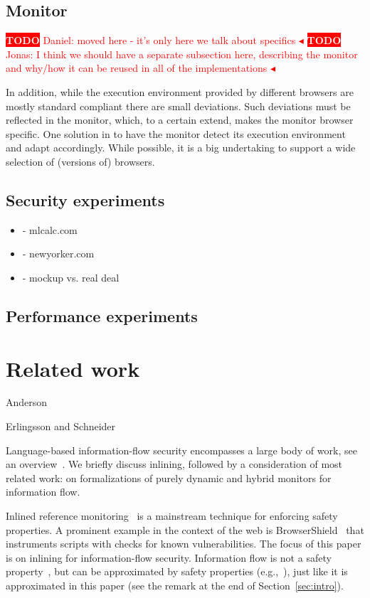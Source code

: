 \documentclass{llncs}
\newcommand{\todo}[1]{\colorbox{red}{\textcolor{white}{\sffamily\bfseries\scriptsize TODO}} \textcolor{red}{#1} \textcolor{red}{$\blacktriangleleft$}}
\begin{document}
\subsection{Monitor}

\todo{Daniel: moved here - it's only here we talk about specifics}
\todo{Jonas: I think we should have a separate subsection here, describing the monitor and why/how it can be reused in all of the implementations}

In addition, while the
execution environment provided by different browsers are mostly standard
compliant there are small deviations. Such deviations must be reflected in 
the monitor, which, to a certain extend, makes the monitor browser specific.
One solution in to have the monitor detect its execution environment
and adapt accordingly. While possible, it is a big undertaking to support
a wide selection of (versions of) browsers.


\subsection{Security experiments}

\begin{itemize}
\item- mlcalc.com
\item- newyorker.com
\item- mockup vs. real deal
\end{itemize}

\subsection{Performance experiments}

\section{Related work}
\label{sec:related}

Anderson~\cite{Anderson:72}

Erlingsson and Schneider~\cite{DBLP:conf/nspw/ErlingssonS99}

Language-based information-flow security encompasses a large body of
work, see an overview~\cite{Sabelfeld:Myers:JSAC}. We briefly
discuss inlining, followed by a consideration of most related work: on
formalizations of purely dynamic and hybrid monitors for information flow.

Inlined reference monitoring~\cite{Erlingsson:PhD04} is a mainstream
technique for enforcing safety properties. 
A prominent example in the context of the web is
BrowserShield~\cite{Reis+:TWeb07} that instruments scripts with
checks for known vulnerabilities.
The focus of this paper is on inlining for information-flow security. Information flow is not
a safety property~\cite{McLean:SSP94}, but can be approximated by
safety properties
(e.g.,~\cite{Boudol:FAST08,Sabelfeld:Russo:PSI09,Austin:Flanagan:PLAS09}),
just like it is approximated in this paper (see the remark at the end of Section~\ref{sec:intro}).
\end{document}
